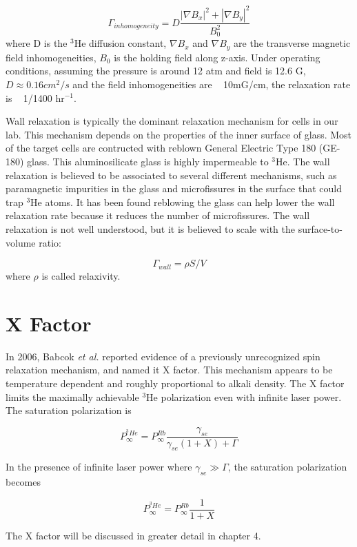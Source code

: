 \begin{equation}
\Gamma_{inhomogeneity} = D\frac{|\nabla B_{x}|^{2}+|\nabla B_{y}|^{2}}{B_{0}^{2}}
\end{equation}
where D is the $^{3}$He diffusion constant, $\nabla B_{x}$ and $\nabla B_{y}$ are the transverse magnetic field inhomogeneities, $B_{0}$ is the holding field along z-axis. Under operating conditions, assuming the pressure is around 12 atm and field is 12.6 G, $D\approx 0.16cm^{2}/s$ and the field inhomogeneities are ~ 10mG/cm, the relaxation rate is ~ 1/1400 hr$^{-1}$.

Wall relaxation is typically the dominant relaxation mechanism for cells in our lab. This mechanism depends on the properties of the inner surface of glass. Most of the target cells are contructed with reblown General Electric Type 180 (GE-180) glass. This aluminosilicate glass is highly impermeable to $^{3}$He. The wall relaxation is believed to be associated to several different mechanisms, such as paramagnetic impurities in the glass and microfissures in the surface that could trap $^{3}$He atoms. It has been found reblowing the glass can help lower the wall relaxation rate because it reduces the number of microfissures. The wall relaxation is not well understood, but it is believed to scale with the surface-to-volume ratio:

\begin{equation}
\Gamma_{wall} = \rho S/V
\end{equation}
where $\rho$ is called relaxivity.

\section{X Factor}

In 2006, Babcok \emph{et al.} reported evidence of a previously unrecognized spin relaxation mechanism, and named it X factor. This mechanism appears to be temperature dependent and roughly proportional to alkali density. The X factor limits the maximally achievable $^{3}$He polarization even with infinite laser power. The saturation polarization is 

\begin{equation}
P_{\infty}^{^{3}He}=P_{\infty}^{Rb}\frac{\gamma_{se}}{\gamma_{se}(1+X)+\Gamma}
\end{equation}

In the presence of infinite laser power where $\gamma_{se} \gg \Gamma$, the saturation polarization becomes

\begin{equation}
P_{\infty}^{^{3}He}=P_{\infty}^{Rb}\frac{1}{1+X}
\end{equation}

The X factor will be discussed in greater detail in chapter 4.


















